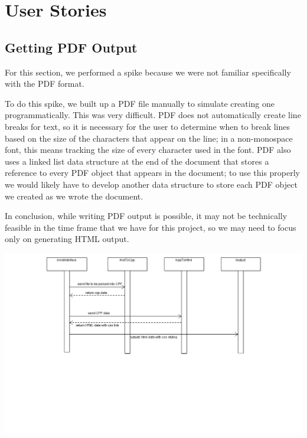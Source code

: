 \section{User Stories}

\subsection{Getting PDF Output}
For this section, we performed a spike because we were not familiar specifically with the PDF format.

To do this spike, we built up a PDF file manually to simulate creating one programmatically. This was very difficult. PDF does not automatically create line breaks for text, so it is necessary for the user to determine when to break lines based on the size of the characters that appear on the line; in a non-monospace font, this means tracking the size of every character used in the font. PDF also uses a linked list data structure at the end of the document that stores a reference to every PDF object that appears in the document; to use this properly we would likely have to develop another data structure to store each PDF object we created as we wrote the document.

In conclusion, while writing PDF output is possible, it may not be technically feasible in the time frame that we have for this project, so we may need to focus only on generating HTML output.

\hspace{-5cm}\includegraphics[width=700pt]{images/Output.png}

